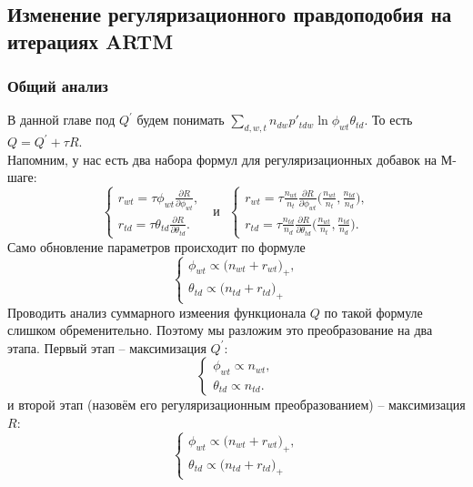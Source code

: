 \documentclass[12pt]{article}
\begin{document}
	\subsection{Изменение регуляризационного правдоподобия на итерациях ARTM}
	\subsubsection{Общий анализ}
В данной главе под $Q^{\prime}$ будем понимать $\sum\limits_{d, w, t} n_{dw} p'_{tdw} \ln{\phi_{wt}\theta_{td}}$. То есть $Q = Q^{\prime} + \tau R$.\\
Напомним, у нас есть два набора формул для регуляризационных добавок на М-шаге:
\[
\left\{
	\begin{aligned}
		r_{wt}= \tau\phi_{wt} \frac{\partial{R}}{\partial{\phi_{wt}}},\\
		r_{td} = \tau\theta_{td} \frac{\partial{R}}{\partial{\theta_{td}}}.
	\end{aligned}
\right.
\text{~~и~~}
\left\{
	\begin{aligned}
		r_{wt} = \tau \frac{n_{wt}}{n_t} \frac{\partial{R}}{\partial{\phi_{wt}}} \biggl(\frac{n_{wt}}{n_t}, \frac{n_{td}}{n_d}\biggr),\\
		r_{td}= \tau \frac{n_{td}}{n_d} \frac{\partial{R}}{\partial{\theta_{td}}} \biggl(\frac{n_{wt}}{n_t}, \frac{n_{td}}{n_d}\biggr).
	\end{aligned}
\right.
\]
Само обновление параметров происходит по формуле 
\[
\left\{
\begin{aligned}
 \phi_{wt}  \propto \bigl(n_{wt} + r_{wt} \bigr)_{+},\\
\theta_{td} \propto  \bigl(n_{td} + r_{td}\bigr)_{+}
\end{aligned}
\right.
\]
Проводить анализ суммарного измеения функционала $Q$ по такой формуле слишком обременительно. Поэтому мы разложим это преобразование на два этапа. Первый этап -- максимизация $Q^{\prime}$:
\[
\left\{
	\begin{aligned}
		\phi_{wt} \propto n_{wt},\\
		\theta_{td} \propto n_{td} .
	\end{aligned}
\right.
\]
и второй этап (назовём его регуляризационным преобразованием) -- максимизация $R$:
\[
\left\{
\begin{aligned}
 \phi_{wt}  \propto \bigl(n_{wt} + r_{wt} \bigr)_{+},\\
\theta_{td} \propto  \bigl(n_{td} + r_{td}\bigr)_{+}
\end{aligned}
\right.
\]
\end{document}
